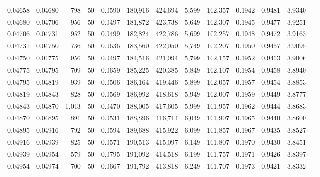 \begin{tabular}{rrrrrrrrrrrrr}
0.04658 & 0.04680 &   798 &  50 &                                     0.0590 & 180,916 & 424,694 &   5,599 & 102,357 & 0.1942 & 0.9481 & 3.9340 \\
0.04680 & 0.04706 &   956 &  50 &                                     0.0497 & 181,872 & 423,738 &   5,649 & 102,307 & 0.1945 & 0.9477 & 3.9251 \\
0.04706 & 0.04731 &   952 &  50 &                                     0.0499 & 182,824 & 422,786 &   5,699 & 102,257 & 0.1948 & 0.9472 & 3.9163 \\
0.04731 & 0.04750 &   736 &  50 &                                     0.0636 & 183,560 & 422,050 &   5,749 & 102,207 & 0.1950 & 0.9467 & 3.9095 \\
0.04750 & 0.04775 &   956 &  50 &                                     0.0497 & 184,516 & 421,094 &   5,799 & 102,157 & 0.1952 & 0.9463 & 3.9006 \\
0.04775 & 0.04795 &   709 &  50 &                                     0.0659 & 185,225 & 420,385 &   5,849 & 102,107 & 0.1954 & 0.9458 & 3.8940 \\
0.04795 & 0.04819 &   939 &  50 &                                     0.0506 & 186,164 & 419,446 &   5,899 & 102,057 & 0.1957 & 0.9454 & 3.8853 \\
0.04819 & 0.04843 &   828 &  50 &                                     0.0569 & 186,992 & 418,618 &   5,949 & 102,007 & 0.1959 & 0.9449 & 3.8777 \\
0.04843 & 0.04870 & 1,013 &  50 &                                     0.0470 & 188,005 & 417,605 &   5,999 & 101,957 & 0.1962 & 0.9444 & 3.8683 \\
0.04870 & 0.04895 &   891 &  50 &                                     0.0531 & 188,896 & 416,714 &   6,049 & 101,907 & 0.1965 & 0.9440 & 3.8600 \\
0.04895 & 0.04916 &   792 &  50 &                                     0.0594 & 189,688 & 415,922 &   6,099 & 101,857 & 0.1967 & 0.9435 & 3.8527 \\
0.04916 & 0.04939 &   825 &  50 &                                     0.0571 & 190,513 & 415,097 &   6,149 & 101,807 & 0.1970 & 0.9430 & 3.8451 \\
0.04939 & 0.04954 &   579 &  50 &                                     0.0795 & 191,092 & 414,518 &   6,199 & 101,757 & 0.1971 & 0.9426 & 3.8397 \\
0.04954 & 0.04974 &   700 &  50 &                                     0.0667 & 191,792 & 413,818 &   6,249 & 101,707 & 0.1973 & 0.9421 & 3.8332 \\

\end{tabular}
